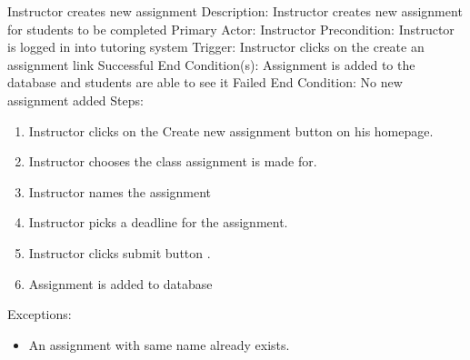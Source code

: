     \begin{section}{Instructor creates new assignment}
		Description: Instructor creates new assignment for students to be completed \newline
		Primary Actor: Instructor \newline
		Precondition: Instructor is logged in into tutoring system \newline
		Trigger: Instructor clicks on the create an assignment link \newline
		Successful End Condition(s): Assignment is added to the database and students are able to see it \newline
		Failed End Condition: No new assignment added \newline
        \newline
        Steps:
        \begin{enumerate}
            \item{Instructor clicks on the Create new assignment button on his homepage.}
            \item{Instructor chooses the class assignment is made for.}
            \item{Instructor names the assignment}
            \item{Instructor picks a deadline for the assignment.}
            \item{Instructor clicks submit button .}
            \item{Assignment is added to database}
        \end{enumerate}
        Exceptions:
        \begin{itemize}
            \item{An assignment with same name already exists.}
        \end{itemize}
    \end{section}


